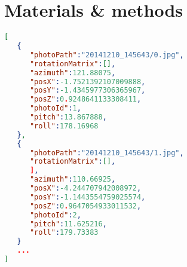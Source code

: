 

\chapter{Materials \& methods} %
\begin{lstlisting}[language=json,firstnumber=1, float]
[
   {
      "photoPath":"20141210_145643/0.jpg",
      "rotationMatrix":[],
      "azimuth":121.88075,
      "posX":-1.7521392107009888,
      "posY":-1.4345977306365967,
      "posZ":0.9248641133308411,
      "photoId":1,
      "pitch":13.867888,
      "roll":178.16968
   },
   {
      "photoPath":"20141210_145643/1.jpg",
      "rotationMatrix":[],
      ],
      "azimuth":110.66925,
      "posX":-4.244707942008972,
      "posY":-1.1443554759025574,
      "posZ":0.9647054933011532,
      "photoId":2,
      "pitch":11.625216,
      "roll":179.73383
   }
   ...
]
\end{lstlisting}



\ifpdf
    \graphicspath{{8/figures/PNG/}{8/figures/PDF/}{8/figures/}}
\else
    \graphicspath{{8/figures/EPS/}{8/figures/}}
\fi





 




 






